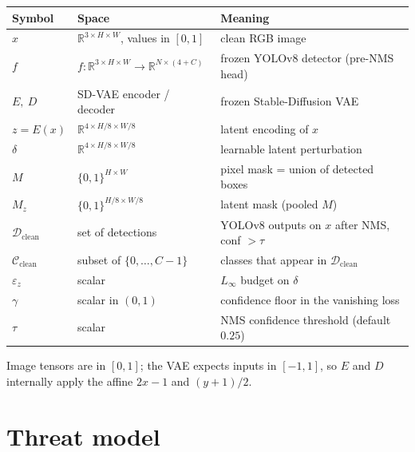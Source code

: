 \documentclass[11pt,a4paper]{article}
\newcommand{\R}{\mathbb{R}}
\begin{document}
\begin{center}
\small
\begin{tabular}{@{}lll@{}}
\toprule
Symbol & Space & Meaning \\
\midrule
$x$              & $\R^{3 \times H \times W}$, values in $[0,1]$ & clean RGB image \\
$f$              & $f : \R^{3 \times H \times W} \to \R^{N \times (4+C)}$ & frozen YOLOv8 detector (pre-NMS head) \\
$E,\ D$          & SD-VAE encoder / decoder & frozen Stable-Diffusion VAE \\
$z = E(x)$       & $\R^{4 \times H/8 \times W/8}$ & latent encoding of $x$ \\
$\delta$         & $\R^{4 \times H/8 \times W/8}$ & learnable latent perturbation \\
$M$              & $\{0,1\}^{H \times W}$ & pixel mask = union of detected boxes \\
$M_z$            & $\{0,1\}^{H/8 \times W/8}$ & latent mask (pooled $M$) \\
$\mathcal{D}_{\text{clean}}$ & set of detections & YOLOv8 outputs on $x$ after NMS, conf $> \tau$ \\
$\mathcal{C}_{\text{clean}}$ & subset of $\{0,\ldots,C-1\}$ & classes that appear in $\mathcal{D}_{\text{clean}}$ \\
$\varepsilon_z$  & scalar & $L_\infty$ budget on $\delta$ \\
$\gamma$         & scalar in $(0,1)$ & confidence floor in the vanishing loss \\
$\tau$           & scalar & NMS confidence threshold (default $0.25$) \\
\bottomrule
\end{tabular}
\end{center}

\noindent Image tensors are in $[0,1]$; the VAE expects inputs in $[-1,1]$, so
$E$ and $D$ internally apply the affine $2x-1$ and $(y+1)/2$.

\section{Threat model}\label{sec:threat}
\end{document}
